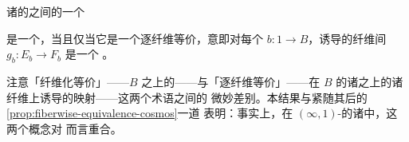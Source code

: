\begin{proposition}\label{prop:fiberwise-equivalence-cartesian-functor}
诸\trQuasiCategory{}的\trCocartesianFibration{}之间的一个\trCartesianFunctor
\begin{center}
\end{center}
是一个\trFiberedEquivalence，当且仅当它是一个逐纤维等价，意即对每个\trElement{}
$b\colon 1\to B$，诱导的纤维间\trFunctor{} $g_{b}\colon E_{b}\to F_{b}$ 是一个%
\trEquivalence。
\end{proposition}

注意「纤维化等价」——$B$ 之上的\trEquivalence——与「逐纤维等价」——在 $B$
的诸\trElement{}之上的诸纤维上诱导\trEquivalence{}的映射——这两个术语之间的
微妙差别。本结果与紧随其后的\cref{prop:fiberwise-equivalence-cosmos}一道
表明：事实上，在
$(\infty,1)$-\trCategory{}的诸\trInfinityCosmos{}中，这两个概念对%
\trCartesianFunctor{}而言重合。

